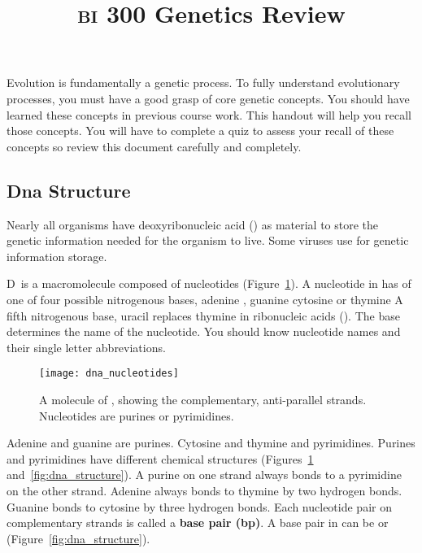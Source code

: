 \documentclass[letterpaper]{tufte-handout}
\title{{\scshape bi} 300 Genetics Review}
\date{} %
\begin{document}
\maketitle	%


Evolution is fundamentally a genetic process. To fully understand evolutionary processes, you must have a good grasp of core genetic concepts. You should have learned these concepts in previous course work. This handout will help you recall those concepts. You will have to complete a quiz to assess your recall of these concepts so review this document carefully and completely. 

\subsection*{Dna Structure}

Nearly all organisms have deoxyribonucleic acid () as material to store the genetic information needed for the organism to live. Some viruses use  for genetic information storage.

D\, is a macromolecule composed of nucleotides (Figure~\ref{fig:dna}). A nucleotide in  has of one of four possible nitrogenous bases, adenine , guanine  cytosine  or thymine  A fifth nitrogenous base, uracil  replaces thymine in ribonucleic acids (). The base determines the name of the nucleotide. You should know nucleotide names and their single letter abbreviations.

\begin{figure}
\texttt{[image: dna\_nucleotides]}

\caption{A molecule of , showing the complementary, anti-parallel strands. Nucleotides are purines or pyrimidines. }\label{fig:dna}
\end{figure}


Adenine and guanine are purines. Cytosine and thymine and pyrimidines. Purines and pyrimidines have different chemical structures (Figures~\ref{fig:dna} and~\ref{fig:dna_structure}). A purine on one  strand always bonds to a pyrimidine on the other strand. Adenine always bonds to thymine by two hydrogen bonds. Guanine bonds to cytosine by three hydrogen bonds.  Each nucleotide pair on complementary strands is called a \textbf{base pair (bp)}. A  base pair in  can be  or  (Figure~\ref{fig:dna_structure}).
\end{document}
